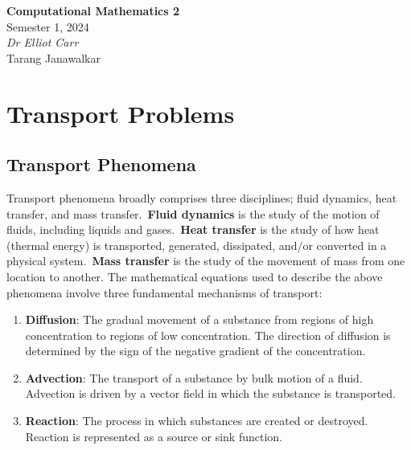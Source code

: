 \documentclass{article}
\date{}
\newcommand{\unitName}{Computational Mathematics 2}
\newcommand{\unitTime}{Semester 1, 2024}
\newcommand{\unitCoordinator}{Dr Elliot Carr}
\newcommand{\documentAuthors}{Tarang Janawalkar}
\begin{document}
%
\begin{titlepage}
    \vspace*{\fill}
    \begin{center}
        \LARGE{\textbf{\unitName}} \\[0.1in]
        \normalsize{\unitTime} \\[0.2in]
        \normalsize\textit{\unitCoordinator} \\[0.2in]
        \documentAuthors
    \end{center}
    \vspace*{\fill}
    \doclicenseThis
    \thispagestyle{empty}
\end{titlepage}
\newpage
%
\tableofcontents
\newpage
%
\section{Transport Problems}
\subsection{Transport Phenomena}
Transport phenomena broadly comprises three disciplines; fluid
dynamics, heat transfer, and mass transfer.\ \textbf{Fluid dynamics} is
the study of the motion of fluids, including liquids and gases.\
\textbf{Heat transfer} is the study of how heat (thermal energy) is
transported, generated, dissipated, and/or converted in a physical
system.\ \textbf{Mass transfer} is the study of the movement of mass
from one location to another. The mathematical equations used to
describe the above phenomena involve three fundamental mechanisms of
transport:
\begin{enumerate}
    \item \textbf{Diffusion}: The gradual movement of a substance from regions of high
          concentration to regions of low concentration. The direction of
          diffusion is determined by the sign of the negative gradient of the
          concentration.
    \item \textbf{Advection}: The transport of a substance by bulk motion of a fluid.
          Advection is driven by a vector field in which the substance is
          transported.
    \item \textbf{Reaction}: The process in which substances are created or destroyed.
          Reaction is represented as a source or sink function.
\end{enumerate}
\end{document}
